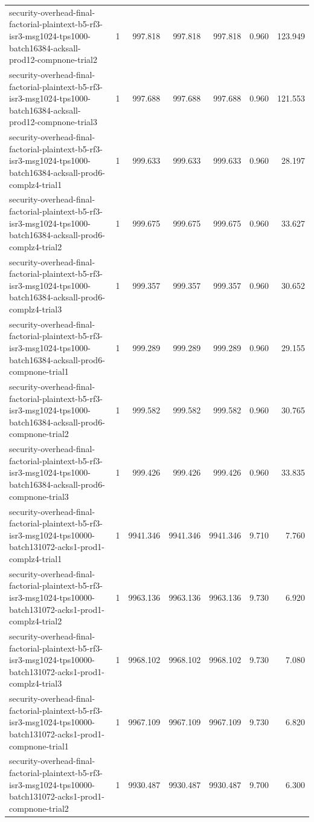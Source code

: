\begin{tabular}{lrrrrrr}
security-overhead-final-factorial-plaintext-b5-rf3-isr3-msg1024-tps1000-batch16384-acksall-prod12-compnone-trial2 & 1 & 997.818 & 997.818 & 997.818 & 0.960 & 123.949 \\
security-overhead-final-factorial-plaintext-b5-rf3-isr3-msg1024-tps1000-batch16384-acksall-prod12-compnone-trial3 & 1 & 997.688 & 997.688 & 997.688 & 0.960 & 121.553 \\
security-overhead-final-factorial-plaintext-b5-rf3-isr3-msg1024-tps1000-batch16384-acksall-prod6-complz4-trial1 & 1 & 999.633 & 999.633 & 999.633 & 0.960 & 28.197 \\
security-overhead-final-factorial-plaintext-b5-rf3-isr3-msg1024-tps1000-batch16384-acksall-prod6-complz4-trial2 & 1 & 999.675 & 999.675 & 999.675 & 0.960 & 33.627 \\
security-overhead-final-factorial-plaintext-b5-rf3-isr3-msg1024-tps1000-batch16384-acksall-prod6-complz4-trial3 & 1 & 999.357 & 999.357 & 999.357 & 0.960 & 30.652 \\
security-overhead-final-factorial-plaintext-b5-rf3-isr3-msg1024-tps1000-batch16384-acksall-prod6-compnone-trial1 & 1 & 999.289 & 999.289 & 999.289 & 0.960 & 29.155 \\
security-overhead-final-factorial-plaintext-b5-rf3-isr3-msg1024-tps1000-batch16384-acksall-prod6-compnone-trial2 & 1 & 999.582 & 999.582 & 999.582 & 0.960 & 30.765 \\
security-overhead-final-factorial-plaintext-b5-rf3-isr3-msg1024-tps1000-batch16384-acksall-prod6-compnone-trial3 & 1 & 999.426 & 999.426 & 999.426 & 0.960 & 33.835 \\
security-overhead-final-factorial-plaintext-b5-rf3-isr3-msg1024-tps10000-batch131072-acks1-prod1-complz4-trial1 & 1 & 9941.346 & 9941.346 & 9941.346 & 9.710 & 7.760 \\
security-overhead-final-factorial-plaintext-b5-rf3-isr3-msg1024-tps10000-batch131072-acks1-prod1-complz4-trial2 & 1 & 9963.136 & 9963.136 & 9963.136 & 9.730 & 6.920 \\
security-overhead-final-factorial-plaintext-b5-rf3-isr3-msg1024-tps10000-batch131072-acks1-prod1-complz4-trial3 & 1 & 9968.102 & 9968.102 & 9968.102 & 9.730 & 7.080 \\
security-overhead-final-factorial-plaintext-b5-rf3-isr3-msg1024-tps10000-batch131072-acks1-prod1-compnone-trial1 & 1 & 9967.109 & 9967.109 & 9967.109 & 9.730 & 6.820 \\
security-overhead-final-factorial-plaintext-b5-rf3-isr3-msg1024-tps10000-batch131072-acks1-prod1-compnone-trial2 & 1 & 9930.487 & 9930.487 & 9930.487 & 9.700 & 6.300 \\

\end{tabular}
